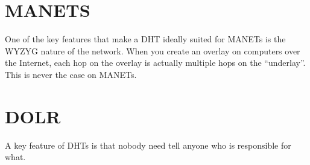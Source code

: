 \documentclass[10pt,letterpaper]{report}
\begin{document}
\chapter{MANETS}
One of the key features that make a DHT ideally suited for MANETs is the WYZYG nature of the network.  When you create an overlay on computers over the Internet, each hop on the overlay is actually multiple hops on the ``underlay''.  This is never the case on MANETs.

\chapter{DOLR}

\cite{rhea2003structured}

A key feature of DHTs is that nobody need tell anyone who is responsible for what.



\end{document}
